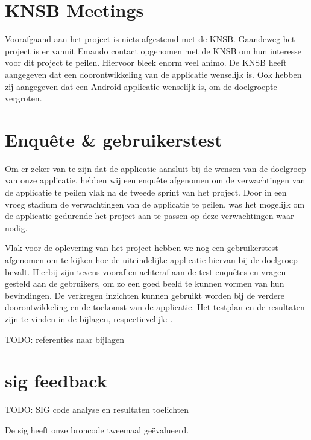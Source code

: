 \section{KNSB Meetings}
Voorafgaand aan het project is niets afgestemd met de \ac{KNSB}. Gaandeweg het project is er vanuit Emando contact opgenomen met de \ac{KNSB} om hun interesse voor dit project te peilen. Hiervoor bleek enorm veel animo. De \ac{KNSB} heeft aangegeven dat een doorontwikkeling van de applicatie wenselijk is. Ook hebben zij aangegeven dat een Android applicatie wenselijk is, om de doelgroepte vergroten.

\section{Enquête \& gebruikerstest}
Om er zeker van te zijn dat de applicatie aansluit bij de wensen van de doelgroep van onze applicatie, hebben wij een enquête afgenomen om de verwachtingen van de applicatie te peilen vlak na de tweede sprint van het project. Door in een vroeg stadium de verwachtingen van de applicatie te peilen, was het mogelijk om de applicatie gedurende het project aan te passen op deze verwachtingen waar nodig. 

Vlak voor de oplevering van het project hebben we nog een gebruikerstest afgenomen om te kijken hoe de uiteindelijke applicatie hiervan bij de doelgroep bevalt. Hierbij zijn tevens vooraf en achteraf aan de test enquêtes en vragen gesteld aan de gebruikers, om zo een goed beeld te kunnen vormen van hun bevindingen. De verkregen inzichten kunnen gebruikt worden bij de verdere doorontwikkeling en de toekomst van de applicatie. Het testplan en de resultaten zijn te vinden in de bijlagen, respectievelijk: .
{\par \bigskip \par \color{red} TODO: referenties naar bijlagen \par \bigskip \par }

\section{\acs{sig} feedback}

{\par \bigskip \par \color{red} TODO: SIG code analyse en resultaten toelichten \par \bigskip \par }

De \acf{sig} heeft onze broncode tweemaal geëvalueerd.